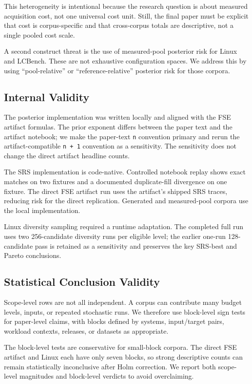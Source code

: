 \documentclass[smallcondensed]{svjour3}
\begin{document}
This heterogeneity is intentional because the research question is about
measured acquisition cost, not one universal cost unit. Still, the final
paper must be explicit that cost is corpus-specific and that
cross-corpus totals are descriptive, not a single pooled cost scale.

A second construct threat is the use of measured-pool posterior risk for
Linux and LCBench. These are not exhaustive configuration spaces. We
address this by using ``pool-relative'' or ``reference-relative''
posterior risk for those corpora.

\subsection{Internal Validity}\label{internal-validity}

The posterior implementation was written locally and aligned with the
FSE artifact formulas. The prior exponent differs between the paper text
and the artifact notebook; we make the paper-text \texttt{n} convention
primary and rerun the artifact-compatible \texttt{n\ +\ 1} convention as
a sensitivity. The sensitivity does not change the direct artifact
headline counts.

The SRS implementation is code-native. Controlled notebook replay shows
exact matches on two fixtures and a documented duplicate-fill divergence
on one fixture. The direct FSE artifact run uses the artifact's shipped
SRS traces, reducing risk for the direct replication. Generated and
measured-pool corpora use the local implementation.

Linux diversity sampling required a runtime adaptation. The completed
full run uses two 256-candidate diversity runs per eligible level; the
earlier one-run 128-candidate pass is retained as a sensitivity and
preserves the key SRS-best and Pareto conclusions.

\subsection{Statistical Conclusion
Validity}\label{statistical-conclusion-validity}

Scope-level rows are not all independent. A corpus can contribute many
budget levels, inputs, or repeated stochastic runs. We therefore use
block-level sign tests for paper-level claims, with blocks defined by
systems, input/target pairs, workload contexts, releases, or datasets as
appropriate.

The block-level tests are conservative for small-block corpora. The
direct FSE artifact and Linux each have only seven blocks, so strong
descriptive counts can remain statistically inconclusive after Holm
correction. We report both scope-level magnitudes and block-level
verdicts to avoid overclaiming.
\end{document}
